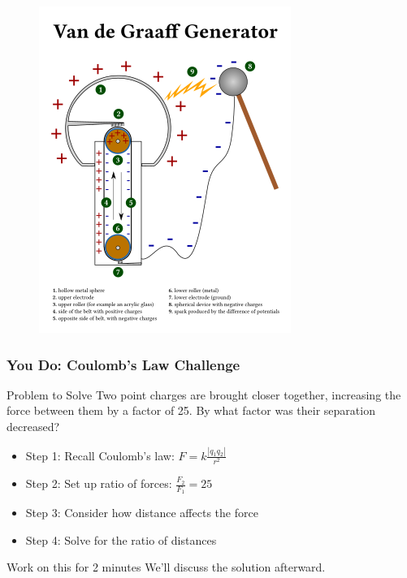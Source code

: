 \documentclass{beamer}
\begin{document}
\begin{frame}{}
    \begin{figure}
        \centering
        \includegraphics[width=0.6\linewidth]{Van_de_Graaff_Generator.svg.png}
    \end{figure}
\end{frame}

\begin{frame}
    \frametitle{You Do: Coulomb's Law Challenge}
    
    \begin{exampleblock}{Problem to Solve}
        Two point charges are brought closer together, increasing the force between them by a factor of 25. By what factor was their separation decreased?
    \end{exampleblock}
    
    \begin{itemize}
        \item Step 1: Recall Coulomb's law: $F = k\frac{|q_1 q_2|}{r^2}$
        \item Step 2: Set up ratio of forces: $\frac{F_2}{F_1} = 25$
        \item Step 3: Consider how distance affects the force
        \item Step 4: Solve for the ratio of distances
    \end{itemize}
    
    \begin{alertblock}{Work on this for 2 minutes}
        We'll discuss the solution afterward.
    \end{alertblock}
\end{frame}
\end{document}
